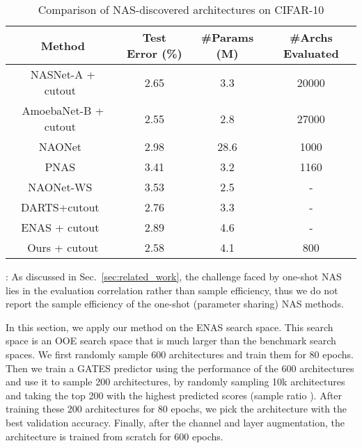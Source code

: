 \documentclass[runningheads]{llncs}
\begin{document}
\addtolength{\tabcolsep}{1pt}
\begin{table}[tb]
  \caption{Comparison of NAS-discovered architectures on CIFAR-10}
  \label{table:nas-enas}
  \begin{center}
    \begin{tabular}{cccc}
      \toprule
      Method & Test Error (\%) & \#Params (M) & \#Archs Evaluated\\\midrule
      NASNet-A + cutout~\cite{zoph2016neural}         & 2.65 & 3.3   & 20000 \\
      AmoebaNet-B + cutout~\cite{real2019regularized} & 2.55 & 2.8   & 27000 \\
      NAONet~\cite{nao2018}                           & 2.98 & 28.6  & 1000  \\
      PNAS~\cite{liu2018progressive}                  & 3.41 & 3.2   & 1160  \\\cmidrule(lr){1-4}
      NAONet-WS~\cite{nao2018}                        & 3.53 & 2.5   & -     \\
      DARTS+cutout~\cite{darts}                       & 2.76 & 3.3   & -     \\
      ENAS + cutout~\cite{pham2018efficient}          & 2.89 & 4.6   & -     \\ \hline
      Ours + cutout                                   & 2.58 & 4.1  & 800   \\ \bottomrule
    \end{tabular}
      \begin{minipage}{1.0\textwidth}
: As discussed in Sec.~\ref{sec:related_work}, the challenge faced by one-shot NAS lies in the evaluation correlation rather than sample efficiency, thus we do not report the sample efficiency of the one-shot (parameter sharing) NAS methods.
\end{minipage}
  \end{center}
\end{table}
\addtolength{\tabcolsep}{-1pt}

In this section, we apply our method on the ENAS search space. This search space is an OOE search space that is much larger than the benchmark search spaces. We first randomly sample 600 architectures and train them for 80 epochs.
Then we train a GATES predictor using the performance of the 600 architectures and use it
to sample 200 architectures, by randomly sampling 10k architectures and taking the top 200
with the highest predicted scores (sample ratio ). After training these 200 architectures for 80 epochs, we pick the architecture with the best validation accuracy. Finally, after the channel and layer augmentation, the architecture is trained from scratch for 600 epochs.
\end{document}
